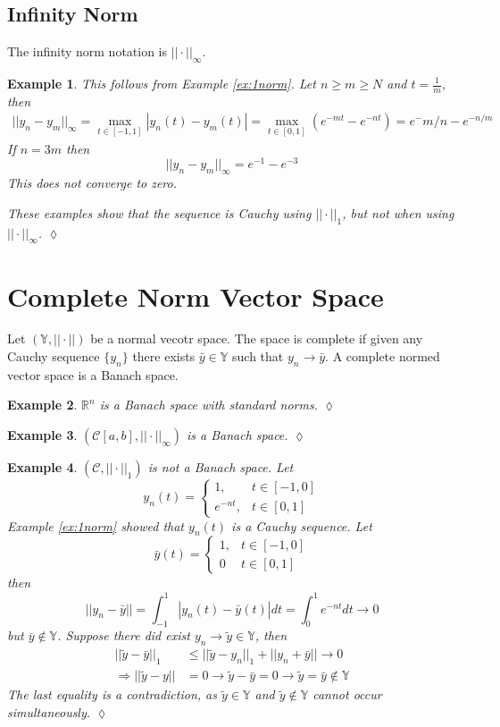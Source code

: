 \documentclass[lecture,12pt,]{pcms-l}
\theoremstyle{example}
\newtheorem{example}{Example}[section]
\newcommand{\vsp}{(\mathbb{Y},||\cdot||)}
\begin{document}
\subsection{Infinity Norm}
The infinity norm notation is $||\cdot||_\infty$.
\begin{example}
This follows from Example \ref{ex:1norm}. Let $n\geq m\geq N$ and $t=\frac{1}{m}$, then
\begin{align*}
||y_n-y_m||_\infty = \max_{t\in[-1,1]}|y_n(t)-y_m(t)| = \max_{t\in[0,1]}(e^{-mt}-e^{-nt}) = e^-{m/n}-e^{-n/m}
\end{align*}
If $n=3m$ then
$$||y_n-y_m||_\infty = e^{-1}-e^{-3}$$
This does not converge to zero.

These examples show that the sequence is Cauchy using $||\cdot||_1$, but not when using $||\cdot||_\infty$.
$\lozenge$
\end{example}

\section{Complete Norm Vector Space}
\begin{definition}
Let $\vsp$ be a normal vecotr space. The space is complete if given any Cauchy sequence $\{y_n\}$ there exists $\bar{y}\in\mathbb{Y}$ such that $y_n\to\bar{y}$. A complete normed vector space is a Banach space.
\end{definition}

\begin{example}
$\mathbb{R}^n$ is a Banach space with standard norms.
$\lozenge$
\end{example}

\begin{example}
$(\mathcal{C}[a,b],||\cdot||_\infty)$ is a Banach space.
$\lozenge$
\end{example}

\begin{example}
$(\mathcal{C},||\cdot||_1)$ is \textit{not} a Banach space. Let
$$y_n(t) = \begin{cases} 1, & t\in[-1,0] \\ e^{-nt}, & t\in[0,1] \end{cases}$$
Example \ref{ex:1norm} showed that $y_n(t)$ is a Cauchy sequence. Let
$$\bar{y}(t) = \begin{cases} 1, & t\in[-1,0] \\ 0 & t\in[0,1] \end{cases}$$
then
$$||y_n-\bar{y}|| = \int_{-1}^1|y_n(t)-\bar{y}(t)|dt = \int_0^1e^{-nt}dt\to 0$$
\textit{but} $\bar{y}\notin\mathbb{Y}$. Suppose there did exist $y_n\to\tilde{y}\in\mathbb{Y}$, then
\begin{align*}
||\tilde{y}-\bar{y}||_1 &\leq ||\tilde{y}-y_n||_1+||y_n+\bar{y}||\to 0 \\
\Rightarrow ||\tilde{y}-y|| &= 0 \to \tilde{y}-\bar{y}=0 \to \tilde{y}=\bar{y}\notin\mathbb{Y}
\end{align*}
The last equality is a contradiction, as $\tilde{y}\in\mathbb{Y}$ and $\tilde{y}\notin\mathbb{Y}$ cannot occur simultaneously.
$\lozenge$
\end{example}
\end{document}
